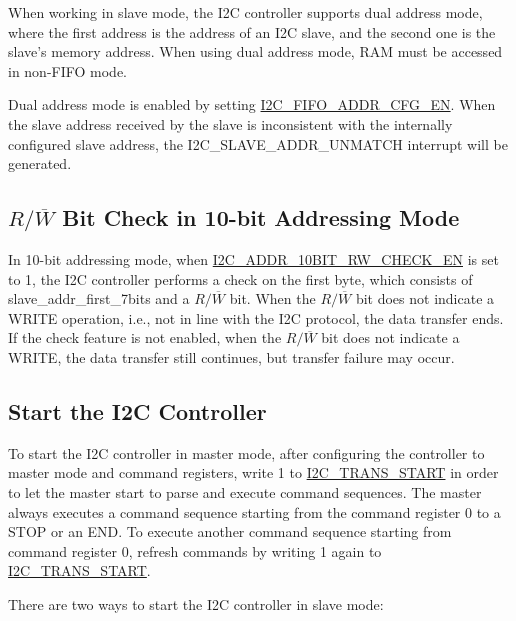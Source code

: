 \documentclass[main\_\_EN.tex]{subfiles}
\begin{document}
When working in slave mode, the I2C controller supports dual address mode, where the first address is the address of an I2C slave, and the second one is the slave's memory address. When using dual address mode, RAM must be accessed in non-FIFO mode.

Dual address mode is enabled by setting \hyperref[fielddesc:I2CFIFOADDRCFGEN]{I2C\_FIFO\_ADDR\_CFG\_EN}. When the slave address received by the slave is inconsistent with the internally configured slave address, the I2C\_SLAVE\_ADDR\_UNMATCH interrupt will be generated.

\subsection{\texorpdfstring{$R/\overline W$ Bit Check in 10-bit Addressing Mode}{R/W Bit Check in 10-bit Addressing Mode}}

In 10-bit addressing mode, when \hyperref[fielddesc:I2CADDR10BITRWCHECKEN]{I2C\_ADDR\_10BIT\_RW\_CHECK\_EN} is set to 1, the I2C controller performs a check on the first byte, which consists of slave\_addr\_first\_7bits and a $R/\overline W$ bit. When the $R/\overline W$ bit does not indicate a WRITE operation, i.e., not in line with the I2C protocol, the data transfer ends. If the check feature is not enabled, when the $R/\overline W$ bit does not indicate a WRITE, the data transfer still continues, but transfer failure may occur.

\subsection{Start the I2C Controller}
\label{subsubsec:i2c-start}

To start the I2C controller in master mode, after configuring the controller to master mode and command registers, write 1 to \hyperref[fielddesc:I2CTRANSSTART]{I2C\_TRANS\_START} in order to let the master start to parse and execute command sequences. The master always executes a command sequence starting from the command register 0 to a STOP or an END. To execute another command sequence starting from command register 0, refresh commands by writing 1 again to \hyperref[fielddesc:I2CTRANSSTART]{I2C\_TRANS\_START}.

There are two ways to start the I2C controller in slave mode:
\end{document}
